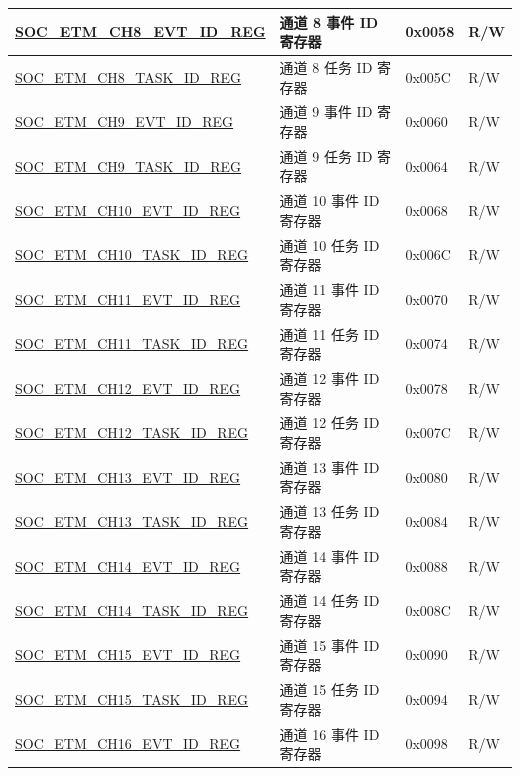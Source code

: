 \begin{longtable}{ | p{6cm} | p{6.2cm} | p{1.3cm} | p{2cm} | }
\hyperref[regdesc:SOCETMCHNEVTIDREG]{SOC\_ETM\_CH8\_EVT\_ID\_REG} & 通道 8 事件 ID 寄存器 & 0x0058 & R/W \\ \hline
\hyperref[regdesc:SOCETMCHNTASKIDREG]{SOC\_ETM\_CH8\_TASK\_ID\_REG} & 通道 8 任务 ID 寄存器 & 0x005C & R/W \\ \hline
\hyperref[regdesc:SOCETMCHNEVTIDREG]{SOC\_ETM\_CH9\_EVT\_ID\_REG} & 通道 9 事件 ID 寄存器 & 0x0060 & R/W \\ \hline
\hyperref[regdesc:SOCETMCHNTASKIDREG]{SOC\_ETM\_CH9\_TASK\_ID\_REG} & 通道 9 任务 ID 寄存器 & 0x0064 & R/W \\ \hline
\hyperref[regdesc:SOCETMCHNEVTIDREG]{SOC\_ETM\_CH10\_EVT\_ID\_REG} & 通道 10 事件 ID 寄存器 & 0x0068 & R/W \\ \hline
\hyperref[regdesc:SOCETMCHNTASKIDREG]{SOC\_ETM\_CH10\_TASK\_ID\_REG} & 通道 10 任务 ID 寄存器 & 0x006C & R/W \\ \hline
\hyperref[regdesc:SOCETMCHNEVTIDREG]{SOC\_ETM\_CH11\_EVT\_ID\_REG} & 通道 11 事件 ID 寄存器 & 0x0070 & R/W \\ \hline
\hyperref[regdesc:SOCETMCHNTASKIDREG]{SOC\_ETM\_CH11\_TASK\_ID\_REG} & 通道 11 任务 ID 寄存器 & 0x0074 & R/W \\ \hline
\hyperref[regdesc:SOCETMCHNEVTIDREG]{SOC\_ETM\_CH12\_EVT\_ID\_REG} & 通道 12 事件 ID 寄存器 & 0x0078 & R/W \\ \hline
\hyperref[regdesc:SOCETMCHNTASKIDREG]{SOC\_ETM\_CH12\_TASK\_ID\_REG} & 通道 12 任务 ID 寄存器 & 0x007C & R/W \\ \hline
\hyperref[regdesc:SOCETMCHNEVTIDREG]{SOC\_ETM\_CH13\_EVT\_ID\_REG} & 通道 13 事件 ID 寄存器 & 0x0080 & R/W \\ \hline
\hyperref[regdesc:SOCETMCHNTASKIDREG]{SOC\_ETM\_CH13\_TASK\_ID\_REG} & 通道 13 任务 ID 寄存器 & 0x0084 & R/W \\ \hline
\hyperref[regdesc:SOCETMCHNEVTIDREG]{SOC\_ETM\_CH14\_EVT\_ID\_REG} & 通道 14 事件 ID 寄存器 & 0x0088 & R/W \\ \hline
\hyperref[regdesc:SOCETMCHNTASKIDREG]{SOC\_ETM\_CH14\_TASK\_ID\_REG} & 通道 14 任务 ID 寄存器 & 0x008C & R/W \\ \hline
\hyperref[regdesc:SOCETMCHNEVTIDREG]{SOC\_ETM\_CH15\_EVT\_ID\_REG} & 通道 15 事件 ID 寄存器 & 0x0090 & R/W \\ \hline
\hyperref[regdesc:SOCETMCHNTASKIDREG]{SOC\_ETM\_CH15\_TASK\_ID\_REG} & 通道 15 任务 ID 寄存器 & 0x0094 & R/W \\ \hline
\hyperref[regdesc:SOCETMCHNEVTIDREG]{SOC\_ETM\_CH16\_EVT\_ID\_REG} & 通道 16 事件 ID 寄存器 & 0x0098 & R/W \\ \hline

\end{longtable}
